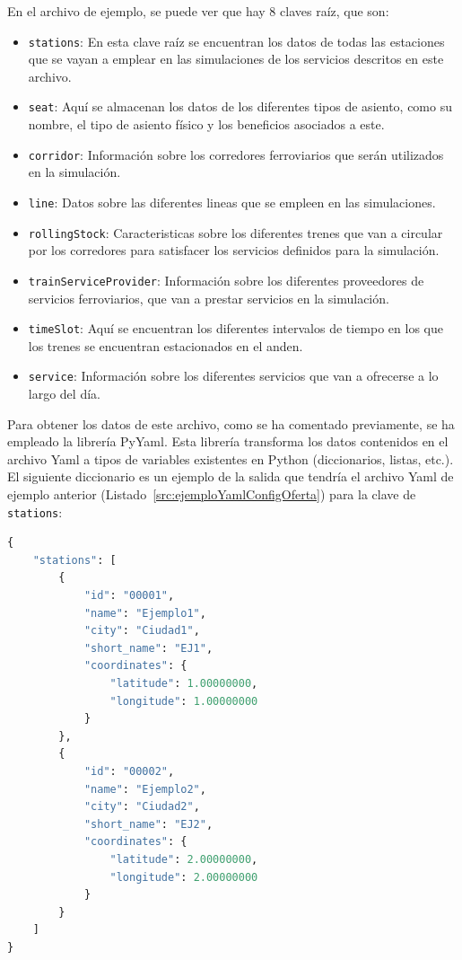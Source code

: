 En el archivo de ejemplo, se puede ver que hay 8 claves raíz, que son:
\begin{itemize}
    \item \texttt{stations}: En esta clave raíz se encuentran los datos de todas las estaciones que se vayan a emplear en las simulaciones de los servicios descritos en este archivo.
    \item \texttt{seat}: Aquí se almacenan los datos de los diferentes tipos de asiento, como su nombre, el tipo de asiento físico y los beneficios asociados a este.
    \item \texttt{corridor}: Información sobre los corredores ferroviarios que serán utilizados en la simulación.
    \item \texttt{line}: Datos sobre las diferentes lineas que se empleen en las simulaciones.
    \item \texttt{rollingStock}: Caracteristicas sobre los diferentes trenes que van a circular por los corredores para satisfacer los servicios definidos para la simulación.
    \item \texttt{trainServiceProvider}: Información sobre los diferentes proveedores de servicios ferroviarios, que van a prestar servicios en la simulación.
    \item \texttt{timeSlot}: Aquí se encuentran los diferentes intervalos de tiempo en los que los trenes se encuentran estacionados en el anden.
    \item \texttt{service}: Información sobre los diferentes servicios que van a ofrecerse a lo largo del día.
\end{itemize}

Para obtener los datos de este archivo, como se ha comentado previamente, se ha empleado la librería PyYaml. Esta librería transforma los datos contenidos en el archivo \acrshort{Yaml} a tipos de variables existentes en Python (diccionarios, listas, etc.). El siguiente diccionario es un ejemplo de la salida que tendría el archivo \acrshort{Yaml} de ejemplo anterior (Listado~\ref{src:ejemploYamlConfigOferta}) para la clave de \texttt{stations}:

\begin{lstlisting}[language=Python,
                   style=python,
                   frame=none,
                   numbers=none,
                   basicstyle=\ttfamily\normalsize,
                   caption={Diccionario de salida de \texttt{stations}},
                   label=src:diccOutputStations,
                   inputencoding=utf8]                   
{
    "stations": [
        {
            "id": "00001",
            "name": "Ejemplo1",
            "city": "Ciudad1",
            "short_name": "EJ1",
            "coordinates": {
                "latitude": 1.00000000,
                "longitude": 1.00000000
            }
        },
        {
            "id": "00002",
            "name": "Ejemplo2",
            "city": "Ciudad2",
            "short_name": "EJ2",
            "coordinates": {
                "latitude": 2.00000000,
                "longitude": 2.00000000
            }
        }
    ]
}
\end{lstlisting}

